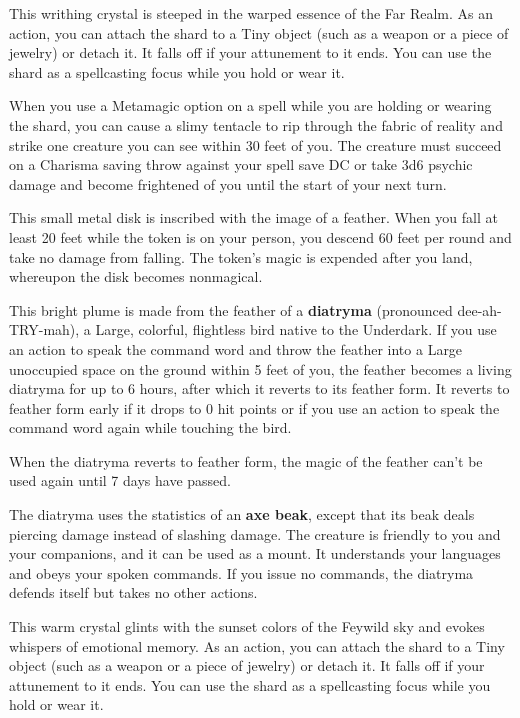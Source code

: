 \documentclass[10pt,a4paper,twoside,bg=print,twocolumn,openany,nodeprecatedcode]{dndbook}
\begin{document}
This writhing crystal is steeped in the warped essence of the Far Realm. As an action, you can attach the shard to a Tiny object (such as a weapon or a piece of jewelry) or detach it. It falls off if your attunement to it ends. You can use the shard as a spellcasting focus while you hold or wear it.

When you use a Metamagic option on a spell while you are holding or wearing the shard, you can cause a slimy tentacle to rip through the fabric of reality and strike one creature you can see within 30 feet of you. The creature must succeed on a Charisma saving throw against your spell save DC or take 3d6 psychic damage and become frightened of you until the start of your next turn.

This small metal disk is inscribed with the image of a feather. When you fall at least 20 feet while the token is on your person, you descend 60 feet per round and take no damage from falling. The token's magic is expended after you land, whereupon the disk becomes nonmagical.

This bright plume is made from the feather of a \textbf{diatryma} (pronounced dee-ah-TRY-mah), a Large, colorful, flightless bird native to the Underdark. If you use an action to speak the command word and throw the feather into a Large unoccupied space on the ground within 5 feet of you, the feather becomes a living diatryma for up to 6 hours, after which it reverts to its feather form. It reverts to feather form early if it drops to 0 hit points or if you use an action to speak the command word again while touching the bird.

When the diatryma reverts to feather form, the magic of the feather can't be used again until 7 days have passed.

The diatryma uses the statistics of an \textbf{axe beak}, except that its beak deals piercing damage instead of slashing damage. The creature is friendly to you and your companions, and it can be used as a mount. It understands your languages and obeys your spoken commands. If you issue no commands, the diatryma defends itself but takes no other actions.

This warm crystal glints with the sunset colors of the Feywild sky and evokes whispers of emotional memory. As an action, you can attach the shard to a Tiny object (such as a weapon or a piece of jewelry) or detach it. It falls off if your attunement to it ends. You can use the shard as a spellcasting focus while you hold or wear it.
\end{document}
